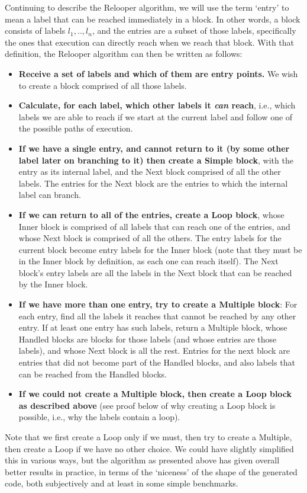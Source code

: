 \documentclass[preprint,10pt]{sigplanconf}
\begin{document}
Continuing to describe the Relooper algorithm, we will use the term `entry' to
mean a label that can be reached immediately in a block. In other
words, a block consists of labels $l_1,..,l_n$, and the entries
are a subset of those labels, specifically the ones that execution
can directly reach when we reach that block. With that
definition, the Relooper algorithm can
then be written as follows:

\begin{itemize}
\item \textbf{Receive a set of labels and which of them are entry points.}
      We wish to create a block comprised of all those labels.
\item \textbf{Calculate, for each label, which other labels it \emph{can}
      reach}, i.e., which labels we are able to reach if we start
      at the current label and follow one of the possible paths
      of execution.
\item \textbf{If we have a single entry, and cannot return to it (by some other
      label later on branching to it) then create a Simple block}, with the entry
      as its internal label, and the Next block comprised of all
      the other labels. The entries for the Next block are the entries
      to which the internal label can branch.
\item \textbf{If we can return to all of the entries, create a
      Loop block}, whose Inner block is comprised of all labels that
      can reach one of the entries, and whose Next block is
      comprised of all the others. The entry labels for the current
      block become entry labels for the Inner block (note that
      they must be in the Inner block by definition, as each one can reach
      itself). The Next block's entry labels are all the labels
      in the Next block that can be reached by the Inner block.
\item \textbf{If we have more than one entry, try to create a Multiple block}: For each entry, find all
      the labels it reaches that cannot be reached by any other
      entry. If at least one entry has such labels, return a
      Multiple block, whose Handled blocks are blocks for those
      labels (and whose entries are those labels), and whose Next block is all the rest.
      Entries for the next block are entries that did not become part of the Handled
      blocks, and also labels that can be reached from the Handled blocks.
\item \textbf{If we could not create a Multiple block, then create a Loop block as described above}
      (see proof below of why creating a Loop block is possible, i.e., why the labels contain a loop).
\end{itemize}
Note that we first create a Loop only if we must, then try to create a
Multiple, then create a Loop if we have no other choice. We could have slightly simplified this in
various ways, but the algorithm as presented above has given overall better
results in practice, in terms of the `niceness' of the shape of the
generated code, both subjectively and at least in some simple benchmarks.
\end{document}

